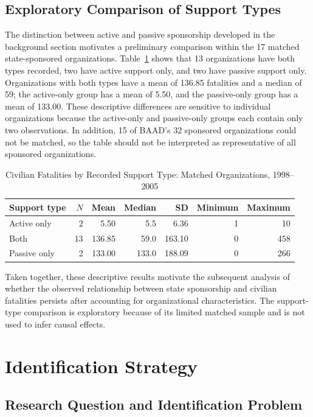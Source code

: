 \documentclass{article}
\begin{document}
\subsection{Exploratory Comparison of Support Types}

The distinction between active and passive sponsorship developed in the background section motivates a preliminary comparison within the 17 matched state-sponsored organizations. Table~\ref{tab:support_types} shows that 13 organizations have both types recorded, two have active support only, and two have passive support only. Organizations with both types have a mean of 136.85 fatalities and a median of 59; the active-only group has a mean of 5.50, and the passive-only group has a mean of 133.00. These descriptive differences are sensitive to individual organizations because the active-only and passive-only groups each contain only two observations. In addition, 15 of BAAD's 32 sponsored organizations could not be matched, so the table should not be interpreted as representative of all sponsored organizations.

\begin{table}[htbp]
\centering
\caption{Civilian Fatalities by Recorded Support Type: Matched Organizations, 1998--2005}
\label{tab:support_types}
\begin{tabular}{lrrrrrr}
\hline
Support type & $N$ & Mean & Median & SD & Minimum & Maximum \\
\hline
Active only & 2 & 5.50 & 5.5 & 6.36 & 1 & 10 \\
Both & 13 & 136.85 & 59.0 & 163.10 & 0 & 458 \\
Passive only & 2 & 133.00 & 133.0 & 188.09 & 0 & 266 \\
\hline
\end{tabular}
\end{table}

Taken together, these descriptive results motivate the subsequent analysis of whether the observed relationship between state sponsorship and civilian fatalities persists after accounting for organizational characteristics. The support-type comparison is exploratory because of its limited matched sample and is not used to infer causal effects.

\section{Identification Strategy}

\subsection{Research Question and Identification Problem}
\end{document}
